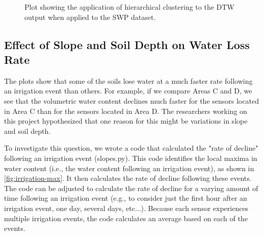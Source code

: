 \documentclass[12pt]{scrartcl}
\begin{document}
\begin{figure}[!htb]
        \caption{\label{fig:SWP-clustering} Plot showing the application of hierarchical clustering to the DTW output when applied to the SWP dataset.}
\end{figure}


\subsection{Effect of Slope and Soil Depth on Water Loss Rate}
The plots show that some of the soils lose water at a much faster rate following an irrigation event than others. For example, if we compare Areas C and D, we see that the volumetric water content declines much faster for the sensors located in Area C than for the sensors located in Area D. The researchers working on this project hypothesized that one reason for this might be variations in slope and soil depth.

To investigate this question, we wrote a code that calculated the "rate of decline" following an irrigation event (slopes.py). This code identifies the local maxima in water content (i.e., the water content following an irrigation event), as shown in \autoref{fig:irrigation-max}. It then calculates the rate of decline following these events. The code can be adjusted to calculate the rate of decline for a varying amount of time following an irrigation event (e.g., to consider just the first hour after an irrigation event, one day, several days, etc...). Because each sensor experiences multiple irrigation events, the code calculates an average based on each of the events.
\end{document}

